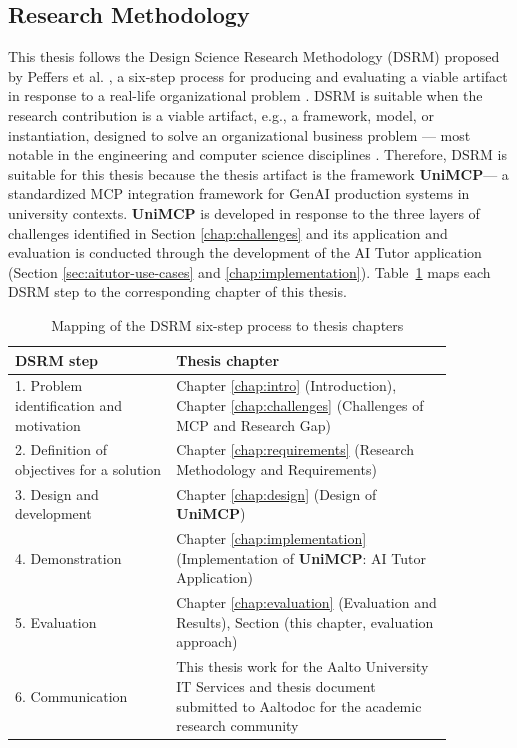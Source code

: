 \documentclass[english, 12pt, a4paper, elec, utf8, a-2b, online]{aaltothesis}
\newcommand{\UniMCP}{\textbf{UniMCP}\xspace}
\begin{document}
\subsection{Research Methodology}
\label{sec:methodology}

This thesis follows the Design Science Research Methodology (DSRM) proposed by Peffers et al. \cite{peffers2007design}, a six-step process for producing and evaluating a viable artifact in response to a real-life organizational problem \cite{hevner2004design}. 
DSRM is suitable when the research contribution is a viable artifact, e.g., a framework, model, or instantiation, designed to solve an organizational business problem --- most notable in the engineering and computer science disciplines \cite{hevner2004design}.
Therefore, DSRM is suitable for this thesis because the thesis artifact is the framework \UniMCP --- a standardized MCP integration framework for GenAI production systems in university contexts. 
\UniMCP is developed in response to the three layers of challenges identified in Section \ref{chap:challenges} and its application and evaluation is conducted through the development of the AI Tutor application (Section \ref{sec:aitutor-use-cases} and \ref{chap:implementation}).
Table~\ref{tab:dsrm-mapping} maps each DSRM step to the corresponding chapter of this thesis.

\begin{table}[h]
\centering
\caption{Mapping of the DSRM six-step process to thesis chapters}
\label{tab:dsrm-mapping}
\begin{tabular}{p{0.32\linewidth} p{0.55\linewidth}}
\toprule
DSRM step & Thesis chapter \\
\midrule
    1. Problem identification and motivation & Chapter \ref{chap:intro} (Introduction),
    Chapter \ref{chap:challenges} (Challenges of MCP and Research Gap) \\
    2. Definition of objectives for a solution & Chapter \ref{chap:requirements} (Research Methodology and Requirements) \\
    3. Design and development & Chapter \ref{chap:design} (Design of \UniMCP) \\
    4. Demonstration & Chapter \ref{chap:implementation} (Implementation of \UniMCP: AI Tutor Application) \\
    5. Evaluation & Chapter \ref{chap:evaluation} (Evaluation and Results), Section (this chapter, evaluation approach) \\
    6. Communication & This thesis work for the Aalto University IT Services and thesis document submitted to Aaltodoc for the academic research community \\
\bottomrule
\end{tabular}
\end{table}
\end{document}
